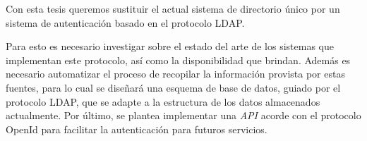 \begin{introduction}
Con esta tesis queremos sustituir el actual sistema de directorio único por un sistema de autenticación basado en el protocolo LDAP.

Para esto es necesario investigar sobre el estado del arte de los sistemas que implementan este protocolo, así como la disponibilidad que brindan. Además es necesario automatizar el proceso de recopilar la información provista por estas fuentes, para lo cual se diseñará una esquema de base de datos, guiado por el protocolo LDAP, que se adapte a la estructura de los datos almacenados actualmente. Por último, se plantea implementar una \textit{API} acorde con el protocolo OpenId para facilitar la autenticación para futuros servicios.

\listoftodos[Notes]

\end{introduction} 